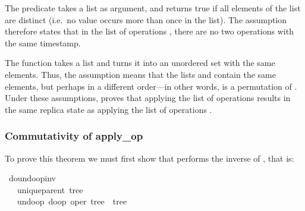 \documentclass[sigplan,anonymous]{acmart}
\renewenvironment{isabelle}{%
  \medbreak\noindent%
  \renewcommand{\isanewline}{\\}%
  \begin{minipage}{\columnwidth}%
  \begin{isabellebody}%
  \begin{tabbing}%
}{%
  \end{tabbing}%
  \end{isabellebody}%
  \end{minipage}%
  \medbreak%
}
\renewcommand{\isacartoucheopen}{}
\renewcommand{\isacartoucheclose}{}
\begin{document}
The predicate  takes a list as argument, and returns true if all elements of the list are distinct (i.e.\ no value occurs more than once in the list).
The assumption  therefore states that in the list of operations , there are no two operations with the same timestamp.

The function  takes a list and turns it into an unordered set with the same elements.
Thus, the assumption  means that the lists  and  contain the same elements, but perhaps in a different order---in other words,  is a permutation of .
Under these assumptions,  proves that applying the list of operations  results in the same replica state as applying the list of operations .

\subsubsection{Commutativity of apply\_op}\label{sec:commutativity}

To prove this theorem we must first show that  performs the inverse of , that is:
\begin{isabelle}
\isamarkupfalse%
\ do{\isacharunderscore}undo{\isacharunderscore}op{\isacharunderscore}inv{\isacharcolon}\isanewline
\ \ \ {\isacartoucheopen}unique{\isacharunderscore}parent\ tree{\isacartoucheclose}\isanewline
\ \ \ {\isacartoucheopen}undo{\isacharunderscore}op\ {\isacharparenleft}do{\isacharunderscore}op\ {\isacharparenleft}oper{\isacharcomma}\ tree{\isacharparenright}{\isacharparenright}\ {\isacharequal}\ tree{\isacartoucheclose}
\end{isabelle}
\end{document}
